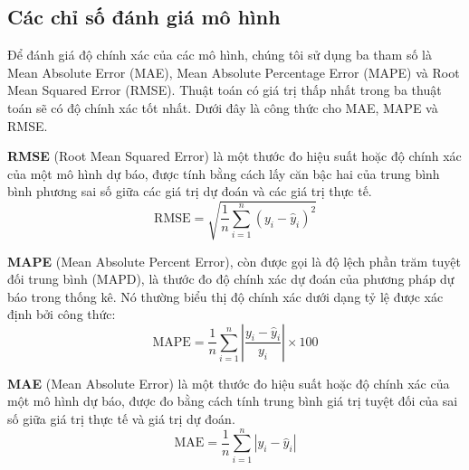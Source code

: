 \subsection{Các chỉ số đánh giá mô hình}
Để đánh giá độ chính xác của các mô hình, chúng tôi sử dụng ba tham số là Mean Absolute Error (MAE), Mean Absolute Percentage Error (MAPE) và Root Mean Squared Error (RMSE). Thuật toán có giá trị thấp nhất trong ba thuật toán sẽ có độ chính xác tốt nhất. Dưới đây là công thức cho MAE, MAPE và RMSE.
\par
\textbf{RMSE} (Root Mean Squared Error) là một thước đo hiệu suất hoặc độ chính xác của một mô hình dự báo, được tính bằng cách lấy căn bậc hai của trung bình bình phương sai số giữa các giá trị dự đoán và các giá trị thực tế.
\[
\text{RMSE} = \sqrt{\frac{1}{n} \sum_{i=1}^{n} (y_i - \hat{y}_i)^2}
\]
\par
\textbf{MAPE}  (Mean Absolute Percent Error), còn được gọi là độ lệch phần trăm tuyệt đối trung bình (MAPD), là thước đo độ chính xác dự đoán của phương pháp dự báo trong thống kê. Nó thường biểu thị độ chính xác dưới dạng tỷ lệ được xác định bởi công thức:
\[
\text{MAPE} = \frac{1}{n} \sum_{i=1}^{n} \left| \frac{y_i - \hat{y}_i}{y_i} \right| \times 100
\]
\par
\textbf{MAE} (Mean Absolute Error) là một thước đo hiệu suất hoặc độ chính xác của một mô hình dự báo, được đo bằng cách tính trung bình giá trị tuyệt đối của sai số giữa giá trị thực tế và giá trị dự đoán.
\[
\text{MAE} = \frac{1}{n} \sum_{i=1}^{n} |y_i - \hat{y}_i|
\]